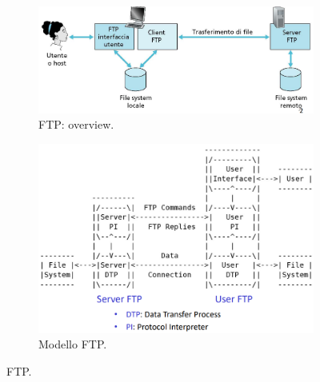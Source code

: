 \documentclass[11pt, italian, openany]{book}
\begin{document}
\begin{sloppypar}
\begin{figure}[!h]
	\begin{subfigure}[t]{0.49 \linewidth} \centering
		\includegraphics[scale=0.26]{images/ftp-overview.png}
		\caption{FTP: overview.}
	\end{subfigure}
	\begin{subfigure}[t]{0.49 \linewidth} \centering
		\includegraphics[scale=0.25]{images/ftp-modello.png}
		\caption{Modello FTP.}
	\end{subfigure}
	\caption{FTP.}
	\label{fig:ftp}
\end{figure}

\pagebreak


\end{sloppypar}
\end{document}

